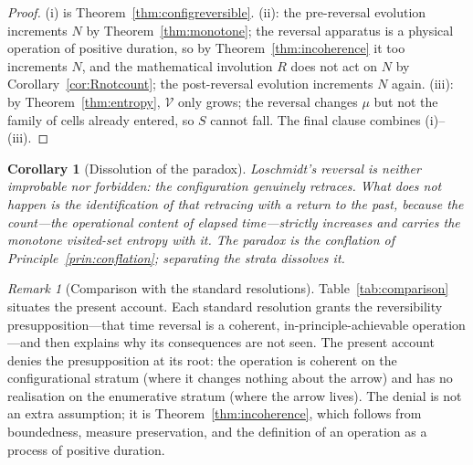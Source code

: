 \documentclass[11pt,a4paper]{article}
\theoremstyle{thmstyle}
\newtheorem{corollary}[theorem]{Corollary}
\theoremstyle{definition}
\theoremstyle{remark}
\newtheorem{remark}[theorem]{Remark}
\newcommand{\Mic}{\mu}
\newcommand{\Count}{N}
\newcommand{\Vis}{\mathcal{V}}
\newcommand{\Tinv}{R}
\begin{document}
\begin{proof}
(i) is Theorem~\ref{thm:configreversible}. (ii): the pre-reversal
evolution increments $\Count$ by Theorem~\ref{thm:monotone}; the reversal
apparatus is a physical operation of positive duration, so by
Theorem~\ref{thm:incoherence} it too increments $\Count$, and the
mathematical involution $\Tinv$ does not act on $\Count$ by
Corollary~\ref{cor:Rnotcount}; the post-reversal evolution increments
$\Count$ again. (iii): by Theorem~\ref{thm:entropy}, $\Vis$ only grows; the
reversal changes $\Mic$ but not the family of cells already entered, so $S$
cannot fall. The final clause combines (i)--(iii).
\end{proof}

\begin{corollary}[Dissolution of the paradox]
\label{cor:dissolution}
Loschmidt's reversal is neither improbable nor forbidden: the configuration
genuinely retraces. What does not happen is the identification of that
retracing with a return to the past, because the count---the operational
content of elapsed time---strictly increases and carries the monotone
visited-set entropy with it. The paradox is the conflation of
Principle~\ref{prin:conflation}; separating the strata dissolves it.
\end{corollary}

\begin{remark}[Comparison with the standard resolutions]
\label{rem:comparison}
Table~\ref{tab:comparison} situates the present account. Each standard
resolution grants the reversibility presupposition---that time reversal is
a coherent, in-principle-achievable operation---and then explains why its
consequences are not seen. The present account denies the presupposition
at its root: the operation is coherent on the configurational stratum
(where it changes nothing about the arrow) and has no realisation on the
enumerative stratum (where the arrow lives). The denial is not an extra
assumption; it is Theorem~\ref{thm:incoherence}, which follows from
boundedness, measure preservation, and the definition of an operation as a
process of positive duration.
\end{remark}
\end{document}
